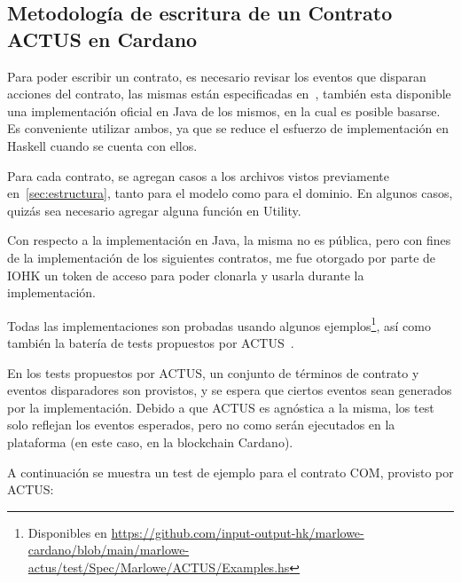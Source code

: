 \documentclass[12pt]{book}
\begin{document}
\subsection{Metodología de escritura de un Contrato ACTUS en Cardano}

Para poder escribir un contrato, es necesario revisar los eventos que disparan acciones del contrato, las mismas están especificadas en~\cite{ACTUS_Techspecs}, también esta disponible una implementación oficial en Java de los mismos, en la cual es posible basarse. Es conveniente utilizar ambos, ya que se reduce el esfuerzo de implementación en Haskell cuando se cuenta con ellos.

Para cada contrato, se agregan casos a los archivos vistos previamente en~\ref{sec:estructura}, tanto para el modelo como para el dominio. En algunos casos, quizás sea necesario agregar alguna función en Utility.

Con respecto a la implementación en Java, la misma no es pública, pero con fines de la implementación de los siguientes contratos, me fue otorgado por parte de IOHK un token de acceso para poder clonarla y usarla durante la implementación.

Todas las implementaciones son probadas usando algunos ejemplos\footnote{Disponibles en \url{https://github.com/input-output-hk/marlowe-cardano/blob/main/marlowe-actus/test/Spec/Marlowe/ACTUS/Examples.hs}}, así como también la batería de tests propuestos por ACTUS~\cite{ACTUS_Tests}.

En los tests propuestos por ACTUS, un conjunto de términos de contrato y eventos disparadores son provistos, y se espera que ciertos eventos sean generados por la implementación. Debido a que ACTUS es agnóstica a la misma, los test solo reflejan los eventos esperados, pero no como serán ejecutados en la plataforma (en este caso, en la blockchain Cardano).

A continuación se muestra un test de ejemplo para el contrato COM, provisto por ACTUS:\@
\end{document}
